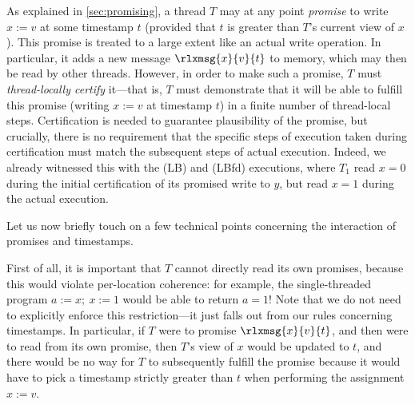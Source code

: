 As explained in \cref{sec:promising}, a thread $T$ may at any point
\emph{promise} to write $x:=v$ at some timestamp $t$ (provided that
$t$ is greater than $T$'s current view of $x$).  This promise is
treated to a large extent like an actual write operation.  In
particular, it adds a new message $\rlxmsg{x}{v}{t}$ to memory, which may then be
read by other threads.  However, in order to make such a promise, $T$
must \emph{thread-locally certify} it---that is, $T$ must demonstrate
that it will be able to fulfill this promise (writing $x:=v$ at
timestamp $t$) in a finite number of thread-local steps.  Certification
is needed to guarantee plausibility of the promise, but crucially,
there is no requirement that the specific steps of execution taken
during certification must match the subsequent steps of actual execution.
Indeed, we already witnessed this with the (LB) and (LBfd) executions,
where $T_1$ read $x=0$ during the initial certification of its promised
write to $y$, but read $x=1$ during the actual execution.

Let us now briefly touch on a few technical points concerning the
interaction of promises and timestamps.


First of all, it is important that $T$ cannot directly read its own
promises, because this would violate per-location coherence: for
example, the single-threaded program $a:=x;~ x:=1$ would be able to
return $a=1$!  Note that we do not need to explicitly enforce this
restriction---it just falls out from our rules concerning timestamps.
In particular, if $T$ were to promise $\rlxmsg{x}{v}{t}$, and then
were to read from its own promise, then $T$'s view of $x$ would be
updated to $t$, and there would be no way for $T$ to subsequently
fulfill the promise because it would have to 
pick a timestamp strictly greater than $t$ when performing 
the assignment $x:=v$.


